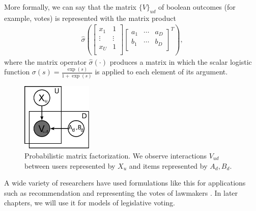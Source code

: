 More formally, we can say that the matrix $\{V\}_{ud}$ of boolean outcomes (for example, votes) is represented with the matrix product
\begin{align}
  \hat \sigma \left( \left[ \begin{array}{cc}
    x_1 & 1 \\
    \vdots & \vdots \\
    x_U & 1 \\
  \end{array}
  \right]
  \left[
    \begin{array}{ccc}
      a_1 & \cdots & a_D \\
      b_1 & \cdots & b_D \\
    \end{array}
    \right]^T 
  \right),
\end{align}
where the matrix operator $\hat \sigma(\cdot)$ produces a matrix in
which the scalar logistic function $\sigma(s) = \frac{\exp(s)}{1 +
  \exp(s)}$ is applied to each element of its argument.

\begin{figure}
  \begin{center}
  \includegraphics[width=0.3\textwidth]{chapter_introductory_material/figs/irt_gm.pdf}
  \end{center}
  \caption{Probabilistic matrix factorization.  We observe
    interactions $V_{ud}$ between users represented by $X_u$ and items
    represented by $A_d, B_d$.}
  \label{figure:irt_gm}
\end{figure}

A wide variety of researchers have used formulations like this for
applications such as recommendation and representing the votes of
lawmakers \citet{wang:2011,salakhutdinov:2008a,poole:1985,poole:1991,clinton:2004}. In later chapters, we will use it for models of legislative voting.


